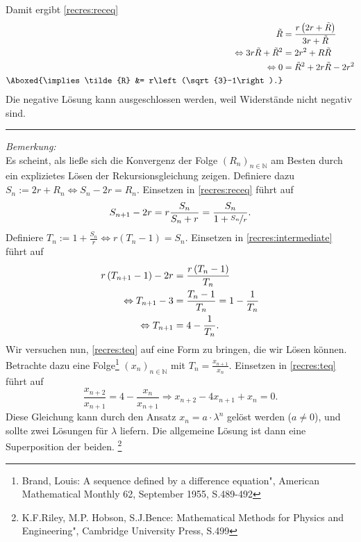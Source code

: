 \begin{Answer}[ref = recres]
	Damit ergibt \eqref{recres:receq}
	\begin{align*}
		 \tilde{R}  &= \frac{r\left(2r+\tilde{R}\right)}{3r+\tilde{R}}\\
		\Leftrightarrow 3r\tilde{R} + \tilde{R}^2 &= 2r^2 + R\tilde{R}\\
		\Leftrightarrow 0&=\tilde{R}^2 + 2r\tilde{R} - 2r^2 \\
		\Aboxed{\implies \tilde{R} &= r\left(\sqrt{3}-1\right).}
	\end{align*}
	Die negative Lösung kann ausgeschlossen werden, weil Widerstände nicht negativ sind.\\
	\noindent\rule{\textwidth}{.75pt}
	\textit{Bemerkung:} \\
	Es scheint, als ließe sich die Konvergenz der Folge $\left(R_n\right)_{n\in \mathbb{N}}$ am Besten durch ein explizietes Lösen der Rekursionsgleichung zeigen.
	Definiere dazu $S_n := 2r + R_n \Leftrightarrow S_n - 2r = R_n$. Einsetzen in \eqref{recres:receq} führt auf 
	\begin{equation}\label{recres:intermediate}
		S_{n+1} - 2r = r\frac{S_n}{S_n+r} = \frac{S_n}{1+\nicefrac{S_n}{r}}.
	\end{equation}
	Definiere $T_n := 1+\frac{S_n}{r} \Leftrightarrow r\left(T_n-1\right) = S_n$. Einsetzen in \eqref{recres:intermediate} führt auf 
	\begin{align}\label{recres:teq}
		r\left(T_{n+1}-1\right) - 2r &= \frac{r\left(T_n-1\right)}{T_n}\notag\\
		\Leftrightarrow T_{n+1}-3 &= \frac{T_n-1}{T_n} = 1 -\frac{1}{T_n}\notag\\
		\Leftrightarrow T_{n+1} &= 4 - \frac{1}{T_n}.
	\end{align}
	Wir versuchen nun, \eqref{recres:teq} auf eine Form zu bringen, die wir Lösen können. Betrachte dazu eine Folge\footnote[2]{Brand, Louis: \glqq A sequence defined by a difference equation", American Mathematical Monthly 62, September 1955, S.489-492} $\left(x_n\right)_{n\in \mathbb{N}}$ mit $T_n = \frac{x_{n+1}}{x_n}$. Einsetzen in \eqref{recres:teq} führt auf 
	\begin{equation}
		\frac{x_{n+2}}{x_{n+1}} = 4 - \frac{x_n}{x_{n+1}} \Rightarrow x_{n+2} - 4x_{n+1} + x_{n} = 0.
	\end{equation}
	Diese Gleichung kann durch den Ansatz $x_n = a\cdot \lambda^n$ gelöst werden ($a\neq 0$), und sollte zwei Lösungen für $\lambda$ liefern. Die allgemeine Lösung ist dann eine Superposition der beiden. \footnote[3]{K.F.Riley, M.P. Hobson, S.J.Bence: \glqq Mathematical Methods for Physics and Engineering", Cambridge University Press, S.499}

\end{Answer}
